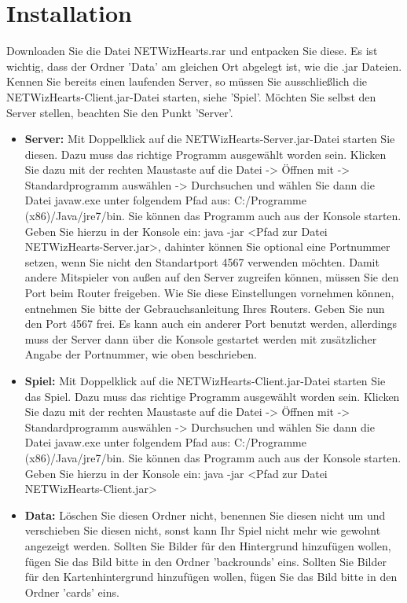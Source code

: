 \documentclass[titlepage,10pt,a4paper]{article}
\begin{document}
\section{Installation}
Downloaden Sie die Datei NETWizHearts.rar und entpacken Sie diese. Es ist wichtig, dass der Ordner 'Data' am gleichen Ort abgelegt ist, wie die .jar Dateien. Kennen Sie bereits einen laufenden Server, so müssen Sie ausschließlich die NETWizHearts-Client.jar-Datei starten, siehe 'Spiel'. Möchten Sie selbst den Server stellen, beachten Sie den Punkt 'Server'.
\begin{itemize}
	\item \textbf{Server:} Mit Doppelklick auf die NETWizHearts-Server.jar-Datei starten Sie diesen. Dazu muss das richtige Programm ausgewählt worden sein. Klicken Sie dazu mit der rechten Maustaste auf die Datei -> Öffnen mit -> Standardprogramm auswählen -> Durchsuchen und wählen Sie dann die Datei javaw.exe unter folgendem Pfad aus: C:/Programme (x86)/Java/jre7/bin.
	Sie können das Programm auch aus der Konsole starten. Geben Sie hierzu in der Konsole ein: java -jar <Pfad zur Datei NETWizHearts-Server.jar>, dahinter können Sie optional eine Portnummer setzen, wenn Sie nicht den Standartport 4567 verwenden möchten.
	Damit andere Mitspieler von außen auf den Server zugreifen können, müssen Sie den Port beim Router freigeben. Wie Sie diese Einstellungen vornehmen können, entnehmen Sie bitte der Gebrauchsanleitung Ihres Routers. Geben Sie nun den Port 4567 frei. Es kann auch ein anderer Port benutzt werden, allerdings muss der Server dann über die Konsole gestartet werden mit zusätzlicher Angabe der Portnummer, wie oben beschrieben.
	
	\item \textbf{Spiel:} Mit Doppelklick auf die NETWizHearts-Client.jar-Datei starten Sie das Spiel. Dazu muss das richtige Programm ausgewählt worden sein. Klicken Sie dazu mit der rechten Maustaste auf die Datei -> Öffnen mit -> Standardprogramm auswählen -> Durchsuchen und wählen Sie dann die Datei javaw.exe unter folgendem Pfad aus: C:/Programme (x86)/Java/jre7/bin.
	Sie können das Programm auch aus der Konsole starten. Geben Sie hierzu in der Konsole ein: java -jar <Pfad zur Datei NETWizHearts-Client.jar>
	
	\item \textbf{Data:} Löschen Sie diesen Ordner nicht, benennen Sie diesen nicht um und verschieben Sie diesen nicht, sonst kann Ihr Spiel nicht mehr wie gewohnt angezeigt werden. Sollten Sie Bilder für den Hintergrund hinzufügen wollen, fügen Sie das Bild bitte in den Ordner 'backrounds' eins. Sollten Sie Bilder für den Kartenhintergrund hinzufügen wollen, fügen Sie das Bild bitte in den Ordner 'cards' eins.
\end{itemize}
\end{document}
